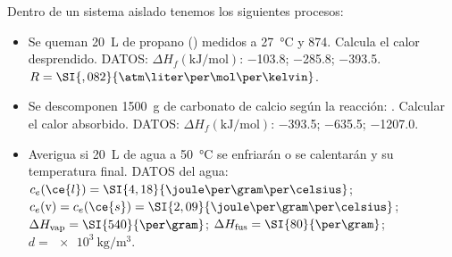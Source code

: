 Dentro de un sistema aislado tenemos los siguientes procesos:
\begin{itemize}
	\item Se queman \SI{20}{\liter} de propano () medidos a \SI{27}{\celsius} y \SI{874}{\torr}. Calcula el calor desprendido. DATOS: $\Delta H_f (\si{\kilo\joule\per\mol})$:  \num{-103,8};  \num{-285,8};  \num{-393,5}. $R = \SI{,082}{\atm\liter\per\mol\per\kelvin}$.
	\item Se descomponen \SI{1500}{\gram} de carbonato de calcio según la reacción: . Calcular el calor absorbido. DATOS: $\Delta H_f (\si{\kilo\joule\per\mol})$:  \num{-393,5};  \num{-635,5};  \num{-1207,0}.
	\item Averigua si \SI{20}{\liter} de agua a \SI{50}{\celsius} se enfriarán o se calentarán y su temperatura final. DATOS del agua: $c_e(\ce{l}) = \SI{4,18}{\joule\per\gram\per\celsius}$; $c_e(\text{v}) = c_e(\ce{s}) = \SI{2,09}{\joule\per\gram\per\celsius}$; $\Delta H_{\text{vap}} = \SI{540}{\cal\per\gram}$; $\Delta H_{\text{fus}} = \SI{80}{\cal\per\gram}$; $d=\SI{e3}{\kilogram\per\cubic\meter}$.
\end{itemize}
